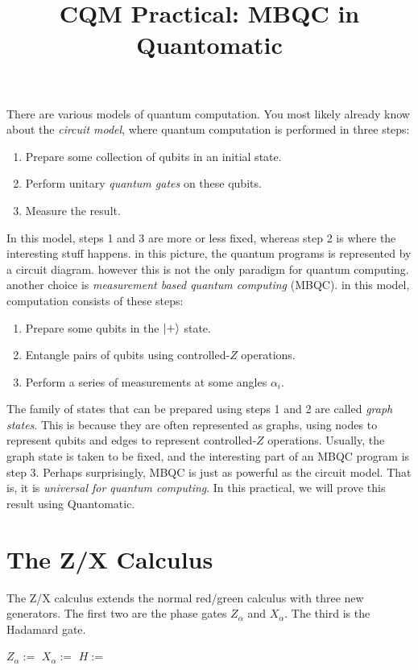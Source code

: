 \documentclass{article}
\title{CQM Practical: MBQC in Quantomatic}
\begin{document}
\maketitle

There are various models of quantum computation. You most likely already know about the \textit{circuit model}, where quantum computation is performed in three steps:

\begin{enumerate}
  \item Prepare some collection of qubits in an initial state.
  \item Perform unitary \textit{quantum gates} on these qubits.
  \item Measure the result.
\end{enumerate}

In this model, steps 1 and 3 are more or less fixed, whereas step 2 is where the interesting stuff happens. in this picture, the quantum programs is represented by a circuit diagram. however this is not the only paradigm for quantum computing. another choice is \textit{measurement based quantum computing} (MBQC). in this model, computation consists of these steps:

\begin{enumerate}
  \item Prepare some qubits in the $\left| + \right\rangle$ state.
  \item Entangle pairs of qubits using controlled-$Z$ operations.
  \item Perform a series of measurements at some angles $\alpha_i$.
\end{enumerate}

The family of states that can be prepared using steps 1 and 2 are called \textit{graph states}. This is because they are often represented as graphs, using nodes to represent qubits and edges to represent controlled-$Z$ operations. Usually, the graph state is taken to be fixed, and the interesting part of an MBQC program is step 3. Perhaps surprisingly, MBQC is just as powerful as the circuit model. That is, it is \textit{universal for quantum computing}. In this practical, we will prove this result using Quantomatic.

\section{The Z/X Calculus}\label{sec:zx}

The Z/X calculus extends the normal red/green calculus with three new generators. The first two are the phase gates $Z_\alpha$ and $X_\alpha$. The third is the Hadamard gate.
\begin{center}
    $Z_\alpha :=$ 
    \qquad\qquad
    $X_\alpha :=$ 
    \qquad\qquad
    $H := $ 
\end{center}
\end{document}
